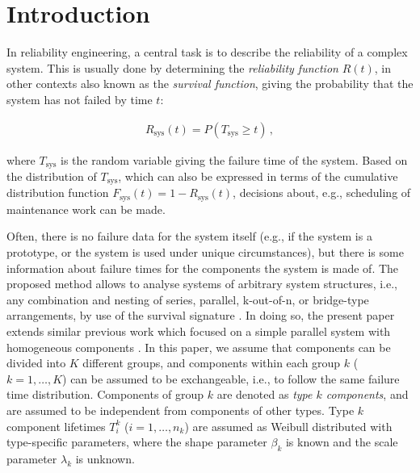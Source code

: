 \documentclass[Journal,SectionNumbers,InsideFigs]{ascelike}
\newcommand{\Rsys}{R_\text{sys}}
\def\Rsys{R_\text{sys}}
\def\Tsys{T_\text{sys}}
\begin{document}


\section{Introduction}
\label{sec:intro}
%
In reliability engineering, a central task is to describe the reliability of a complex system.
This is usually done by determining the \emph{reliability function} $R(t)$,
in other contexts also known as the \emph{survival function},
giving the probability that the system has not failed by time $t$:
\begin{linenomath*}
\begin{align}
\Rsys(t) = P(\Tsys \geq t)\,,
\end{align}
\end{linenomath*}
where $\Tsys$ is the random variable giving the failure time of the system. %
Based on the distribution of $\Tsys$, which can also be expressed
in terms of the cumulative distribution function $F_\text{sys}(t) = 1 - \Rsys(t)$,
decisions about, e.g., scheduling of maintenance work can be made.

Often, there is no failure data for the system itself
(e.g., if the system is a prototype, or the system is used under unique circumstances),
but there is some information about failure times for the components the system is made of.
The proposed method allows to analyse systems of arbitrary system structures, %
i.e., any combination and nesting of series, parallel, k-out-of-n, or bridge-type arrangements,
by use of the survival signature \cite{2012:survsign}.
In doing so, the present paper extends similar previous work
which focused on a simple parallel system with homogeneous components \cite{2015:walter}.
In this paper, we assume that components can be divided into $K$ different groups,
and components within each group $k$ ($k=1, \ldots, K$) can be assumed to be exchangeable,
i.e., to follow the same failure time distribution.
Components of group $k$ are denoted as \emph{type $k$ components},
and are assumed to be independent from components of other types.
Type $k$ component lifetimes $T_i^k$ ($i = 1, \ldots, n_k$)
are assumed as Weibull distributed with type-specific parameters,
where the shape parameter $\beta_k$ is known
and the scale parameter $\lambda_k$ is unknown.
\end{document}
